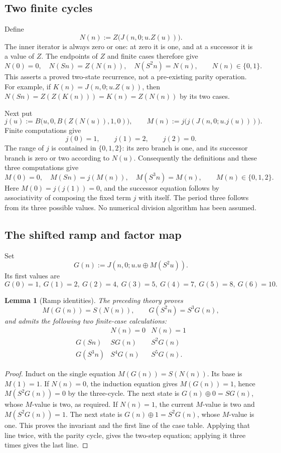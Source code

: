 \documentclass[11pt,letterpaper]{article}
\newtheorem{lemma}[theorem]{Lemma}
\theoremstyle{definition}\newtheorem{definition}[theorem]{Definition}
\theoremstyle{remark}\newtheorem{remark}[theorem]{Remark}
\begin{document}
\subsection{Two finite cycles}\label{js:cycles}

Define
\[
 N(n):=Z\bigl(J(n,0;u.Z(u))\bigr).
\]
The inner iterator is always zero or one: at zero it is one, and at a
successor it is a value of $Z$.  The endpoints of $Z$ and finite cases
therefore give
\[
 N(0)=0,\quad N(Sn)=Z(N(n)),\quad N(S^2n)=N(n),
 \qquad N(n)\in\{0,1\}.
 \tag{Parity cycle}\label{js:parity}
\]
This asserts a proved two-state recurrence, not a pre-existing parity
operation.  For example, if $K(n)=J(n,0;u.Z(u))$, then
$N(Sn)=Z(Z(K(n)))=K(n)=Z(N(n))$ by its two cases.

Next put
\[
 j(u):=B\bigl(u,0,B(Z(N(u)),1,0)\bigr),\qquad
 M(n):=j\bigl(j(J(n,0;u.j(u)))\bigr).
\]
Finite computations give
\[
 j(0)=1,\qquad j(1)=2,\qquad j(2)=0.
\]
The range of $j$ is contained in $\{0,1,2\}$: its zero branch is
one, and its successor branch is zero or two according to $N(u)$.
Consequently the definitions and these three computations give
\[
 M(0)=0,\quad M(Sn)=j(M(n)),\quad M(S^3n)=M(n),
 \qquad M(n)\in\{0,1,2\}.
 \tag{Three-cycle}\label{js:three-cycle}
\]
Here $M(0)=j(j(1))=0$, and the successor equation follows by
associativity of composing the fixed term $j$ with itself.  The period
three follows from its three possible values.  No numerical division
algorithm has been assumed.

\subsection{The shifted ramp and factor map}

Set
\[
 G(n):=J(n,0;u.u\oplus M(S^2u)).
\]
Its first values are
\[
 G(0)=1,\ G(1)=2,\ G(2)=4,\ G(3)=5,\
 G(4)=7,\ G(5)=8,\ G(6)=10.
\]

\begin{lemma}[Ramp identities]\label{js:ramp}
The preceding theory proves
\[
 M(G(n))=S(N(n)),\qquad G(S^2n)=S^3G(n),
 \tag{Ramp}\label{js:ramp-identities}
\]
and admits the following two finite-case calculations:
\[
 \begin{array}{c|cc}
 &N(n)=0&N(n)=1\\ \hline
 G(Sn)&S G(n)&S^2G(n)\\
 G(S^3n)&S^4G(n)&S^5G(n).
 \end{array}
 \tag{Ramp cases}\label{js:ramp-cases}
\]
\end{lemma}
\begin{proof}
Induct on the single equation $M(G(n))=S(N(n))$.
Its base is $M(1)=1$.  If $N(n)=0$, the induction equation gives
$M(G(n))=1$, hence $M(S^2G(n))=0$ by the three-cycle.  The next
state is $G(n)\oplus0=S G(n)$, whose $M$-value is two, as
required.  If $N(n)=1$, the current $M$-value is two and
$M(S^2G(n))=1$.  The next state is
$G(n)\oplus1=S^2G(n)$, whose $M$-value is one.  This proves
the invariant and the first line of the case table.  Applying that line
twice, with the parity cycle, gives the two-step equation; applying it
three times gives the last line.
\end{proof}
\end{document}
